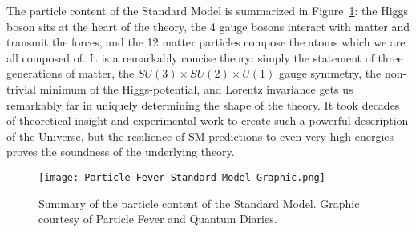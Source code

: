 The particle content of the Standard Model is summarized in Figure~\ref{fig:sm:summary}: the Higgs boson sits at the heart of the theory, the 4 gauge bosons interact with matter and transmit the forces, and the 12 matter particles compose the atoms which we are all composed of. It is a remarkably concise theory: simply the statement of three generations of matter, the $SU(3)\times SU(2)\times U(1)$ gauge symmetry, the non-trivial minimum of the Higgs-potential, and Lorentz invariance gets us remarkably far in uniquely determining the shape of the theory. It took decades of theoretical insight and experimental work to create such a powerful description of the Universe, but the resilience of SM predictions to even very high energies proves the soundness of the underlying theory. 


\begin{figure}
\centering
\texttt{[image: Particle-Fever-Standard-Model-Graphic.png]}
\label{fig:sm:summary}
\caption{Summary of the particle content of the Standard Model. Graphic courtesy of Particle Fever and Quantum Diaries.}
\end{figure}

